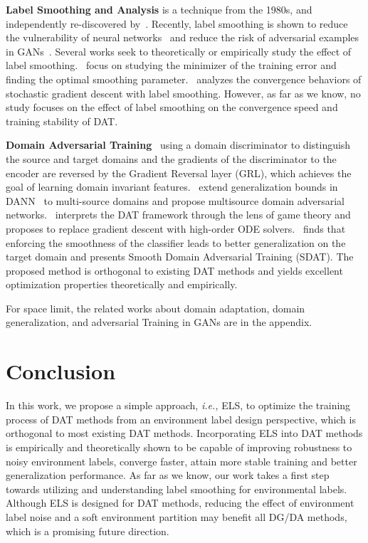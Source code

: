 \documentclass{article} \usepackage{iclr2023_conference,times}
\newcommand{\ls}[0]{ELS\xspace}
\newcommand{\ie}[0]{\textit{i.e., }}
\begin{document}
\noindent\textbf{Label Smoothing and Analysis} is a technique from the 1980s, and independently re-discovered by~\citep{szegedy2016rethinking}. Recently, label smoothing is shown to reduce the vulnerability of neural networks~\citep{warde201611} and reduce the risk of adversarial examples in GANs~\citep{salimans2016improved}. Several works seek to theoretically or empirically study the effect of label smoothing.~\citep{chen2020investigation} focus on studying the minimizer of the training error and finding the optimal smoothing parameter.~\citep{xu2020towards} analyzes the convergence behaviors of stochastic gradient descent with label smoothing. However, as far as we know, no study focuses on the effect of label smoothing on the convergence speed and training stability of DAT.

\noindent\textbf{Domain Adversarial Training}~\citep{ganin2016domain} using a domain discriminator to distinguish the source and target domains and the gradients of the discriminator to the encoder are reversed by the Gradient Reversal layer (GRL), which achieves the goal of learning domain invariant features.~\citep{schoenauer2019multi,zhao2018adversarial} extend generalization bounds in DANN~\citep{ganin2016domain} to multi-source domains and propose multisource domain adversarial networks.~\citep{acuna2022domain} interprets the DAT framework through the lens of game theory and proposes to replace gradient descent with high-order ODE solvers.~\citep{rangwani2022closer} finds that enforcing the smoothness of the classifier leads to better generalization on the target domain and presents Smooth Domain Adversarial Training (SDAT). The proposed method is orthogonal to existing DAT methods and yields excellent optimization properties theoretically and empirically.

For space limit, the related works about domain adaptation, domain generalization, and adversarial Training in GANs are in the appendix.


\vspace{-0.2cm}
\section{Conclusion}
In this work, we propose a simple approach, \ie \ls, to optimize the training process of DAT methods from an environment label design perspective, which is orthogonal to most existing DAT methods. Incorporating \ls into DAT methods is empirically and theoretically shown to be capable of improving robustness to noisy environment labels, converge faster, attain more stable training and better generalization performance. As far as we know, our work takes a first step towards utilizing and understanding label smoothing for environmental labels.  Although \ls is designed for DAT methods, reducing the effect of environment label noise and a soft environment partition may benefit all DG/DA methods, which is a promising future direction.
\end{document}
